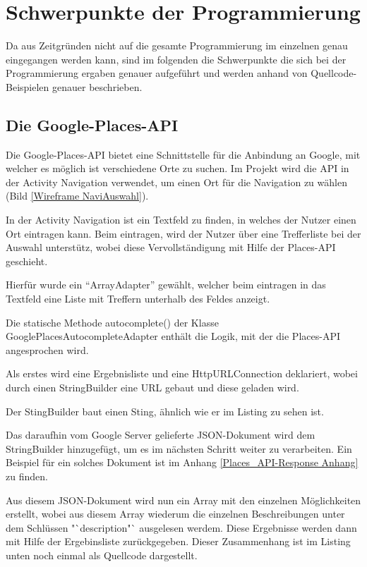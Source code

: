 \section{Schwerpunkte der Programmierung} \label{Schwerpunkte der Programmierung}
Da aus Zeitgr\"unden nicht auf die gesamte Programmierung im einzelnen genau eingegangen werden kann, sind im folgenden die Schwerpunkte die sich bei der Programmierung ergaben genauer aufgef\"uhrt und werden anhand von Quellcode-Beispielen genauer beschrieben.

\subsection{Die Google-Places-API}
Die Google-Places-\ac{API} bietet eine Schnittstelle f\"ur die Anbindung an Google, mit welcher es m\"oglich ist verschiedene Orte zu suchen. Im Projekt wird die \ac{API} in der Activity Navigation verwendet, um einen Ort f\"ur die Navigation zu w\"ahlen (Bild \ref{Wireframe NaviAuswahl}).

In der Activity Navigation ist ein Textfeld zu finden, in welches der Nutzer einen Ort eintragen kann. Beim eintragen, wird der Nutzer \"uber eine Trefferliste bei der Auswahl unterst\"utz, wobei diese Vervollst\"andigung mit Hilfe der Places-\ac{API} geschieht.

Hierf\"ur wurde ein "`ArrayAdapter"' gew\"ahlt, welcher beim eintragen in das Textfeld eine Liste mit Treffern unterhalb des Feldes anzeigt.

Die statische Methode autocomplete() der Klasse GooglePlacesAutocompleteAdapter enth\"alt die Logik, mit der die Places-\ac{API} angesprochen wird.

Als erstes wird eine Ergebnisliste und eine HttpURLConnection deklariert, wobei durch einen StringBuilder eine URL gebaut und diese geladen wird.

Der StingBuilder baut einen Sting, \"ahnlich wie er im Listing zu sehen ist.


Das daraufhin vom Google Server gelieferte JSON-Dokument wird dem StringBuilder hinzugef\"ugt, um es im n\"achsten Schritt weiter zu verarbeiten. Ein Beispiel f\"ur ein solches Dokument ist im Anhang \ref{Places_API-Response Anhang} zu finden.

Aus diesem JSON-Dokument wird nun ein Array mit den einzelnen M\"oglichkeiten erstellt, wobei aus diesem Array wiederum die einzelnen Beschreibungen unter dem Schl\"ussen "`description"` ausgelesen werdem. Diese Ergebnisse werden dann mit Hilfe der Ergebinsliste zur\"uckgegeben. Dieser Zusammenhang ist im Listing unten noch einmal als Quellcode dargestellt.
\cite{PlacesAPIGoogle}


